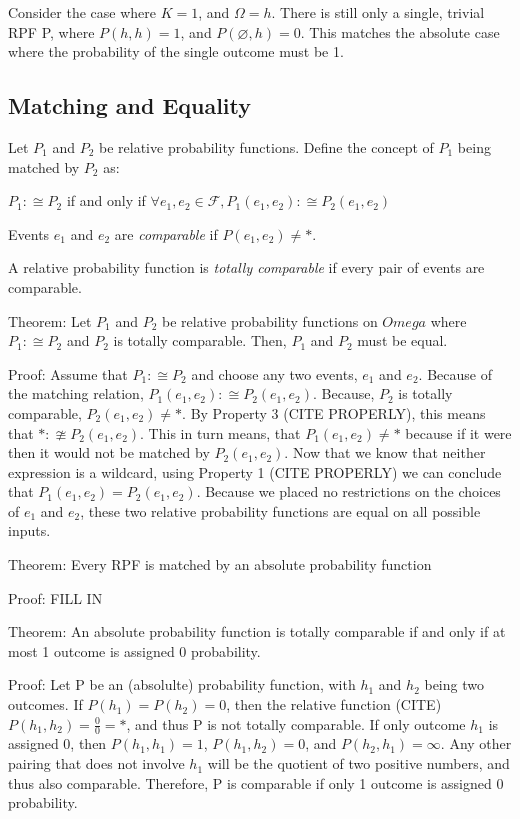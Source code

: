 \documentclass[twoside]{article}
\begin{document}
Consider the case where \(K = 1\), and \(\Omega = {h}\). There is still only a single, trivial RPF P, where \(P(h, h) = 1\), and \(P(\varnothing, h) = 0\). This matches the absolute case where the probability of the single outcome must be 1.

\subsection{Matching and Equality}

Let \(P_1\) and \(P_2\) be relative probability functions. Define the concept of \(P_1\) being matched by \(P_2\) as:

\(P_1 :\cong P_2\) if and only if \(\forall e_1, e_2 \in \mathcal{F}, P_1(e_1, e_2) :\cong P_2(e_1, e_2)\)

Events \(e_1\) and \(e_2\) are \textit{comparable} if \(P(e_1, e_2) \neq \ast\).

A relative probability function is \textit{totally comparable} if every pair of events are comparable. 

Theorem: Let \(P_1\) and \(P_2\) be relative probability functions on \(Omega\) where \(P_1 :\cong P_2\) and \(P_2\) is totally comparable. Then, \(P_1\) and \(P_2\) must be equal.

Proof: Assume that \(P_1 :\cong P_2\) and choose any two events, \(e_1\) and \(e_2\). Because of the matching relation, \(P_1(e_1, e_2) :\cong P_2(e_1, e_2)\). Because, \(P_2\) is totally comparable, \(P_2(e_1, e_2) \neq \ast\). By Property 3 (CITE PROPERLY), this means that \(\ast :\ncong P_2(e_1, e_2)\). This in turn means, that \(P_1(e_1, e_2) \neq \ast\) because if it were then it would not be matched by \(P_2(e_1, e_2)\). Now that we know that neither expression is a wildcard, using Property 1 (CITE PROPERLY) we can conclude that \(P_1(e_1, e_2) = P_2(e_1, e_2)\). Because we placed no restrictions on the choices of \(e_1\) and \(e_2\), these two relative probability functions are equal on all possible inputs.

Theorem: Every RPF is matched by an absolute probability function

Proof: FILL IN

Theorem: An absolute probability function is totally comparable if and only if at most 1 outcome is assigned 0 probability.

Proof: Let P be an (absolulte) probability function, with \(h_1\) and \(h_2\) being two outcomes. If \(P(h_1) = P(h_2) = 0\), then the relative function (CITE) \(P(h_1, h_2) = \frac{0}{0} = \ast\), and thus P is not totally comparable. If only outcome \(h_1\) is assigned 0, then \(P(h_1, h_1) = 1\), \(P(h_1, h_2) = 0\), and \(P(h_2, h_1) = \infty\). Any other pairing that does not involve \(h_1\) will be the quotient of two positive numbers, and thus also comparable. Therefore, P is comparable if only 1 outcome is assigned 0 probability.
\end{document}
